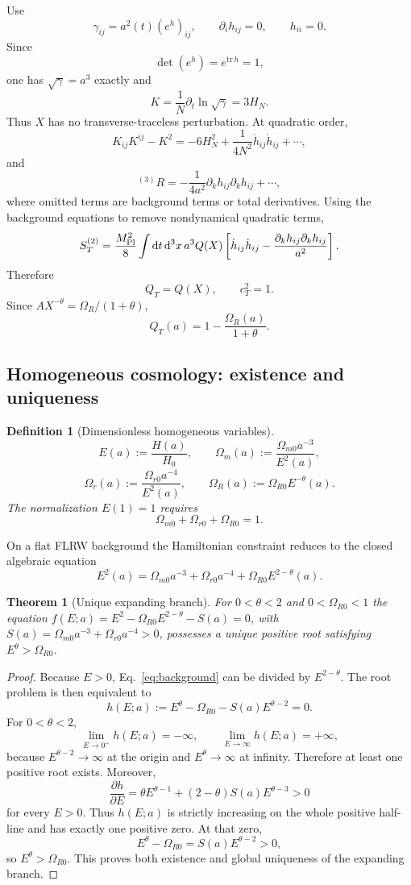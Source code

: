 \documentclass[11pt,a4paper]{article}
\newtheorem{definition}[axiom]{Definition}
\newtheorem{theorem}[axiom]{Theorem}
\renewcommand{\dd}{\mathrm{d}}
\newcommand{\mpl}{M_{\rm Pl}}
\newcommand{\Boxed}[1]{\boxed{\displaystyle #1}}
\begin{document}
Use
\[
\gamma_{ij}=a^2(t)(e^h)_{ij},
\qquad
\partial_i h_{ij}=0,
\qquad
h_{ii}=0.
\]
Since
\[
\det(e^h)=e^{\mathrm{tr}\,h}=1,
\]
one has \(\sqrt{\gamma}=a^3\) exactly and
\[
K=\frac{1}{N}\partial_t\ln\sqrt{\gamma}=3H_N.
\]
Thus \(X\) has no transverse-traceless perturbation. At quadratic order,
\[
K_{ij}K^{ij}-K^2
=
-6H_N^2
+\frac{1}{4N^2}\dot h_{ij}\dot h_{ij}
+\cdots,
\]
and
\[
{}^{(3)}R
=
-\frac{1}{4a^2}
\partial_kh_{ij}\partial_kh_{ij}
+\cdots,
\]
where omitted terms are background terms or total derivatives. Using the
background equations to remove nondynamical quadratic terms,
\[
S_T^{(2)}
=
\frac{\mpl^2}{8}
\int\dd t\,\dd^3x\,a^3Q(X)
\left[
\dot h_{ij}\dot h_{ij}
-\frac{\partial_kh_{ij}\partial_kh_{ij}}{a^2}
\right].
\]
Therefore
\[
Q_T=Q(X),
\qquad
c_T^2=1.
\]
Since \(AX^{-\theta}=\Omega_R/(1+\theta)\),
\[
Q_T(a)=1-\frac{\Omega_R(a)}{1+\theta}.
\]

\subsection{Homogeneous cosmology: existence and uniqueness}

\begin{definition}[Dimensionless homogeneous variables]
\[
E(a):=\frac{H(a)}{H_0},
\qquad
\Omega_m(a):=\frac{\Omega_{m0}a^{-3}}{E^2(a)},
\]
\[
\Omega_r(a):=\frac{\Omega_{r0}a^{-4}}{E^2(a)},
\qquad
\Omega_R(a):=\Omega_{R0}E^{-\theta}(a).
\]
The normalization \(E(1)=1\) requires
\[
\Omega_{m0}+\Omega_{r0}+\Omega_{R0}=1.
\]
\end{definition}

On a flat FLRW background the Hamiltonian constraint reduces to the closed algebraic equation
\begin{equation}
\Boxed{E^2(a)=\Omega_{m0}a^{-3}+\Omega_{r0}a^{-4}+\Omega_{R0}E^{2-\theta}(a).}
\label{eq:background}
\end{equation}

\begin{theorem}[Unique expanding branch]
For \(0<\theta<2\) and \(0<\Omega_{R0}<1\) the equation \(f(E;a)=E^2-\Omega_{R0}E^{2-\theta}-S(a)=0\), with \(S(a)=\Omega_{m0}a^{-3}+\Omega_{r0}a^{-4}>0\), possesses a unique positive root satisfying \(E^\theta>\Omega_{R0}\).
\end{theorem}

\begin{proof}
Because \(E>0\), Eq.~\eqref{eq:background} can be divided by \(E^{2-\theta}\). The root problem is then equivalent to
\[
h(E;a):=
E^\theta-\Omega_{R0}-S(a)E^{\theta-2}=0.
\]
For \(0<\theta<2\),
\[
\lim_{E\to0^+}h(E;a)=-\infty,
\qquad
\lim_{E\to\infty}h(E;a)=+\infty,
\]
because \(E^{\theta-2}\to\infty\) at the origin and \(E^\theta\to\infty\) at infinity. Therefore at least one positive root exists. Moreover,
\[
\frac{\partial h}{\partial E}
=
\theta E^{\theta-1}
+(2-\theta)S(a)E^{\theta-3}>0
\]
for every \(E>0\). Thus \(h(E;a)\) is strictly increasing on the whole positive half-line and has exactly one positive zero. At that zero,
\[
E^\theta-\Omega_{R0}=S(a)E^{\theta-2}>0,
\]
so \(E^\theta>\Omega_{R0}\). This proves both existence and global uniqueness of the expanding branch.
\end{proof}
\end{document}
